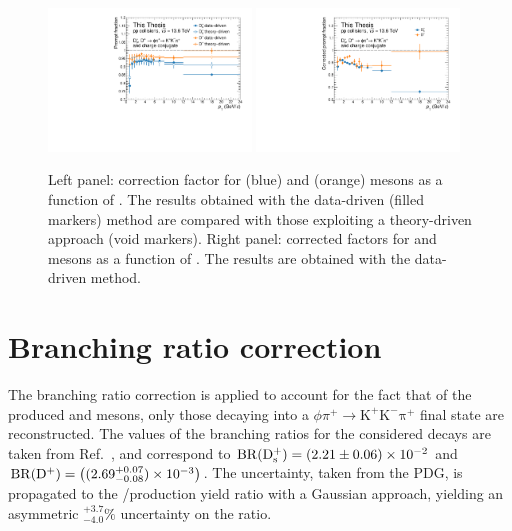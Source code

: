 \begin{figure}
    \begin{center}
    \includegraphics[width=0.48\textwidth]{Figures/Chapter 6/Compare_data_theory_frac.pdf}
    \includegraphics[width=0.48\textwidth]{Figures/Chapter 6/Compare_prompt_frac.pdf}
    \caption{Left panel: \fp correction factor for \ds (blue) and \dpl (orange) mesons as a function of \pt. The results obtained with the data-driven (filled markers) method are compared with those exploiting a theory-driven approach (void markers). Right panel: corrected \fp factors for \ds and \dpl mesons as a function of \pt. The results are obtained with the data-driven method.} 
    \label{fig:fp_comparison} 
    \end{center}
\end{figure}

\section{Branching ratio correction}
\begin{sloppypar}

The branching ratio correction is applied to account for the fact that of the produced \ds and \dpl mesons, only those decaying into a $\phi\pi^+\rightarrow\mathrm{K^+K^-\pi^+}$ final state are reconstructed. The values of the branching ratios for the considered decays are taken from Ref.~\cite{pdg}, and correspond to \mbox{$\mathrm{BR}(\mathrm{D_s^+}) = (2.21\pm0.06)\times10^{-2}$} and \mbox{$\mathrm{BR}(\mathrm{D^+}) = \left((2.69^{+0.07}_{-0.08})\times10^{-3}\right)$}. The uncertainty, taken from the PDG, is propagated to the \ds/\dpl production yield ratio with a Gaussian approach, yielding an asymmetric $^{+3.7}_{-4.0}\%$ uncertainty on the ratio.
\end{sloppypar}

